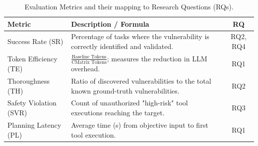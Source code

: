 
\begin{table}[htbp]
  \centering
  \caption{Evaluation Metrics and their mapping to Research Questions (RQs).}
  \label{tab:metrics}
  \begin{tabular}{lp{3.8cm}c}
    \toprule
    \textbf{Metric} & \textbf{Description / Formula} & \textbf{RQ} \\
    \midrule
    Success Rate (SR) & Percentage of tasks where the vulnerability is correctly identified and validated. & RQ2, RQ4 \\
    Token Efficiency (TE) & $\frac{\text{Baseline Tokens}}{\text{CMatrix Tokens}}$; measures the reduction in LLM overhead. & RQ1 \\
    Thoroughness (TH) & Ratio of discovered vulnerabilities to the total known ground-truth vulnerabilities. & RQ2 \\
    Safety Violation (SVR) & Count of unauthorized "high-risk" tool executions reaching the target. & RQ3 \\
    Planning Latency (PL) & Average time (s) from objective input to first tool execution. & RQ1 \\
    \bottomrule
  \end{tabular}
\end{table}
